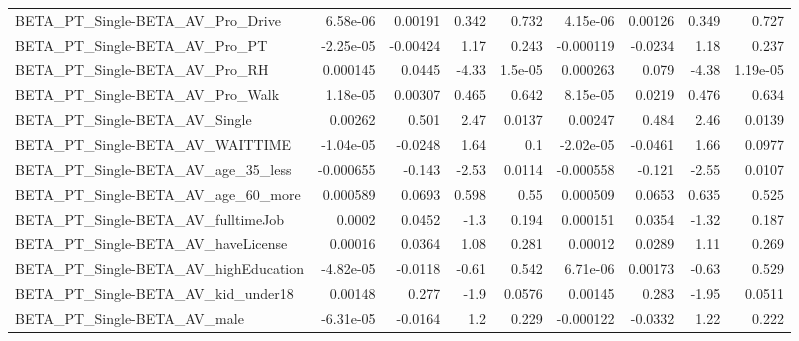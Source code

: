 \begin{tabular}{lrrrrrrrr}
BETA\_PT\_Single-BETA\_AV\_Pro\_Drive                   &    6.58e-06 &      0.00191 &     0.342 &    0.732 &   4.15e-06 &     0.00126 &        0.349 &         0.727 \\
BETA\_PT\_Single-BETA\_AV\_Pro\_PT                      &   -2.25e-05 &     -0.00424 &      1.17 &    0.243 &  -0.000119 &     -0.0234 &         1.18 &         0.237 \\
BETA\_PT\_Single-BETA\_AV\_Pro\_RH                      &    0.000145 &       0.0445 &     -4.33 &  1.5e-05 &   0.000263 &       0.079 &        -4.38 &      1.19e-05 \\
BETA\_PT\_Single-BETA\_AV\_Pro\_Walk                    &    1.18e-05 &      0.00307 &     0.465 &    0.642 &   8.15e-05 &      0.0219 &        0.476 &         0.634 \\
BETA\_PT\_Single-BETA\_AV\_Single                      &     0.00262 &        0.501 &      2.47 &   0.0137 &    0.00247 &       0.484 &         2.46 &        0.0139 \\
BETA\_PT\_Single-BETA\_AV\_WAITTIME                    &   -1.04e-05 &      -0.0248 &      1.64 &      0.1 &  -2.02e-05 &     -0.0461 &         1.66 &        0.0977 \\
BETA\_PT\_Single-BETA\_AV\_age\_35\_less                 &   -0.000655 &       -0.143 &     -2.53 &   0.0114 &  -0.000558 &      -0.121 &        -2.55 &        0.0107 \\
BETA\_PT\_Single-BETA\_AV\_age\_60\_more                 &    0.000589 &       0.0693 &     0.598 &     0.55 &   0.000509 &      0.0653 &        0.635 &         0.525 \\
BETA\_PT\_Single-BETA\_AV\_fulltimeJob                 &      0.0002 &       0.0452 &      -1.3 &    0.194 &   0.000151 &      0.0354 &        -1.32 &         0.187 \\
BETA\_PT\_Single-BETA\_AV\_haveLicense                 &     0.00016 &       0.0364 &      1.08 &    0.281 &    0.00012 &      0.0289 &         1.11 &         0.269 \\
BETA\_PT\_Single-BETA\_AV\_highEducation               &   -4.82e-05 &      -0.0118 &     -0.61 &    0.542 &   6.71e-06 &     0.00173 &        -0.63 &         0.529 \\
BETA\_PT\_Single-BETA\_AV\_kid\_under18                 &     0.00148 &        0.277 &      -1.9 &   0.0576 &    0.00145 &       0.283 &        -1.95 &        0.0511 \\
BETA\_PT\_Single-BETA\_AV\_male                        &   -6.31e-05 &      -0.0164 &       1.2 &    0.229 &  -0.000122 &     -0.0332 &         1.22 &         0.222 \\

\end{tabular}
